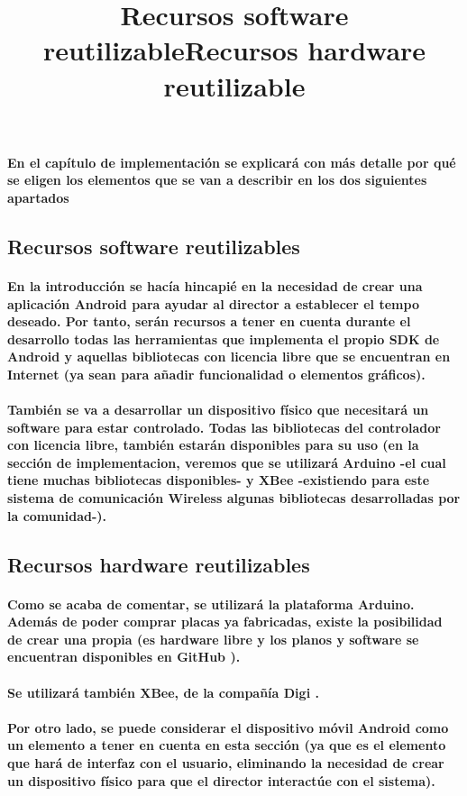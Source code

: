 \paragraph{
En el capítulo de implementación se explicará con más detalle por qué se
eligen los elementos que se van a describir en los dos siguientes apartados
}


\subsection{Recursos software reutilizables}
\title{Recursos software reutilizable}


\paragraph{
En la introducción se hacía hincapié en la necesidad de crear una aplicación
Android para ayudar al director a establecer el tempo deseado. Por tanto,
serán recursos a tener en cuenta durante el desarrollo todas las herramientas
que implementa el propio SDK de Android y aquellas bibliotecas con licencia
libre que se encuentran en Internet (ya sean para añadir funcionalidad o elementos
gráficos).
}

\paragraph{
También se va a desarrollar un dispositivo físico que necesitará un software para estar
controlado. Todas las bibliotecas del controlador con licencia libre, también estarán
disponibles para su uso (en la sección de implementacion, veremos que se utilizará
Arduino -el cual tiene muchas bibliotecas disponibles- y XBee -existiendo para este
sistema de comunicación Wireless algunas bibliotecas desarrolladas por la comunidad-).
}


\subsection{Recursos hardware reutilizables}
\title{Recursos hardware reutilizable}

\paragraph{
Como se acaba de comentar, se utilizará la plataforma Arduino. Además de poder comprar
placas ya fabricadas, existe la posibilidad de crear una propia (es hardware libre y
los planos y software se encuentran disponibles en GitHub \cite{arduinoRepo}).
}

\paragraph{
Se utilizará también XBee, de la compañía Digi \cite{xbeedatasheet}.
}


\paragraph{
Por otro lado, se puede considerar el dispositivo móvil Android como un elemento a
tener en cuenta en esta sección (ya que es el elemento que hará de interfaz con el usuario,
eliminando la necesidad de crear un dispositivo físico para que el director interactúe con
el sistema).
}
